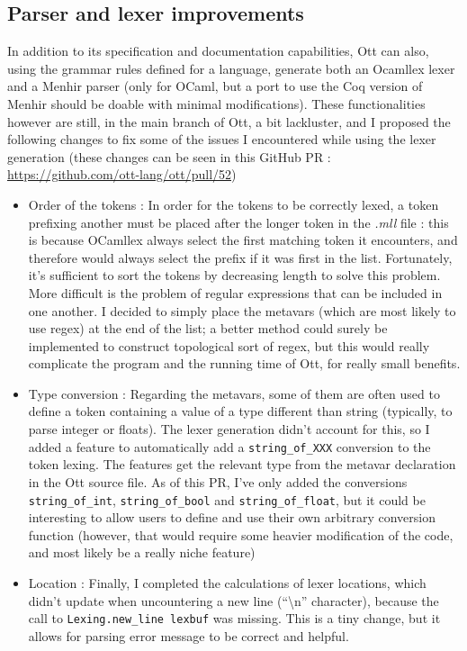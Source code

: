 \documentclass{report}
\begin{document}
\subsection{Parser and lexer improvements}
\label{parserLexerImprov}
In addition to its specification and documentation capabilities, Ott can also, using the grammar rules defined for a language, generate both an Ocamllex lexer and a Menhir parser (only for OCaml, but a port to use the Coq version of Menhir should be doable with minimal modifications). These functionalities however are still, in the main branch of Ott, a bit lackluster, and I proposed the following changes to fix some of the issues I encountered while using the lexer generation (these changes can be seen in this GitHub PR : \url{https://github.com/ott-lang/ott/pull/52})

\begin{itemize}
\item Order of the tokens : In order for the tokens to be correctly lexed, a token prefixing another must be placed after the longer token in the \textit{.mll} file : this is because OCamllex always select the first matching token it encounters, and therefore would always select the prefix if it was first in the list. Fortunately, it's sufficient to sort the tokens by decreasing length to solve this problem. More difficult is the problem of regular expressions that can be included in one another. I decided to simply place the metavars (which are most likely to use regex) at the end of the list; a better method could surely be implemented to construct topological sort of regex, but this would really complicate the program and the running time of Ott, for really small benefits.
\item Type conversion : Regarding the metavars, some of them are often used to define a token containing a value of a type different than string (typically, to parse integer or floats). The lexer generation didn't account for this, so I added a feature to automatically add a \texttt{string\_of\_XXX} conversion to the token lexing. The features get the relevant type from the metavar declaration in the Ott source file. As of this PR, I've only added the conversions \texttt{string\_of\_int}, \texttt{string\_of\_bool} and \texttt{string\_of\_float}, but it could be interesting to allow users to define and use their own arbitrary conversion function (however, that would require some heavier modification of the code, and most likely be a really niche feature)
\item Location : Finally, I completed the calculations of lexer locations, which didn't update when uncountering a new line (``\textbackslash n'' character), because the call to \texttt{Lexing.new\_line lexbuf} was missing. This is a tiny change, but it allows for parsing error message to be correct and helpful.
\end{itemize}
\end{document}
